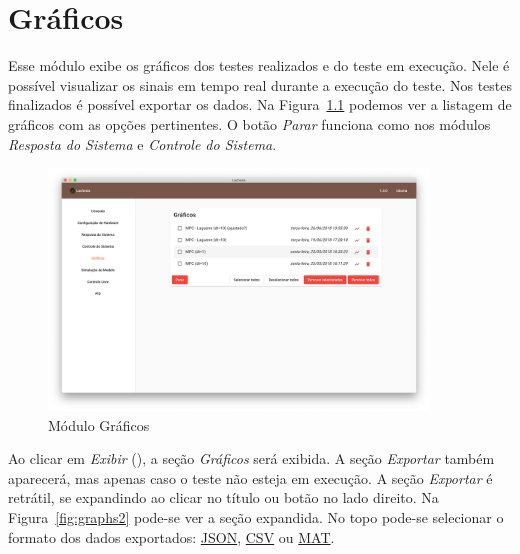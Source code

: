 
\chapter{Gráficos}%
\label{chapter:graficos}

Esse módulo exibe os gráficos dos testes realizados e do teste em execução. Nele
é possível visualizar os sinais em tempo real durante a execução do teste. Nos
testes finalizados é possível exportar os dados. Na Figura~\ref{fig:graphs1}
podemos ver a listagem de gráficos com as opções pertinentes. O botão
\textit{Parar} funciona como nos módulos \textit{Resposta do Sistema} e
\textit{Controle do Sistema}.

\begin{figure}[ht!]
    \centering
    \includegraphics[width=0.9\textwidth]{imgs/graphs1}
    \caption[Módulo Gráficos]{Módulo Gráficos}%
    \label{fig:graphs1}
\end{figure}

Ao clicar em \textit{Exibir} (), a seção \textit{Gráficos}
será exibida. A seção \textit{Exportar} também aparecerá, mas apenas caso o
teste não esteja em execução. A seção \textit{Exportar} é retrátil, se
expandindo ao clicar no título ou botão no lado direito. Na
Figura~\ref{fig:graphs2} pode-se ver a seção expandida. No topo pode-se
selecionar o formato dos dados exportados: \href{https://www.json.org/}{JSON},
\href{https://pt.wikipedia.org/wiki/Comma-separated_values}{CSV} ou
\href{https://www.mathworks.com/help/matlab/import_export/supported-file-formats.html}{MAT}.

